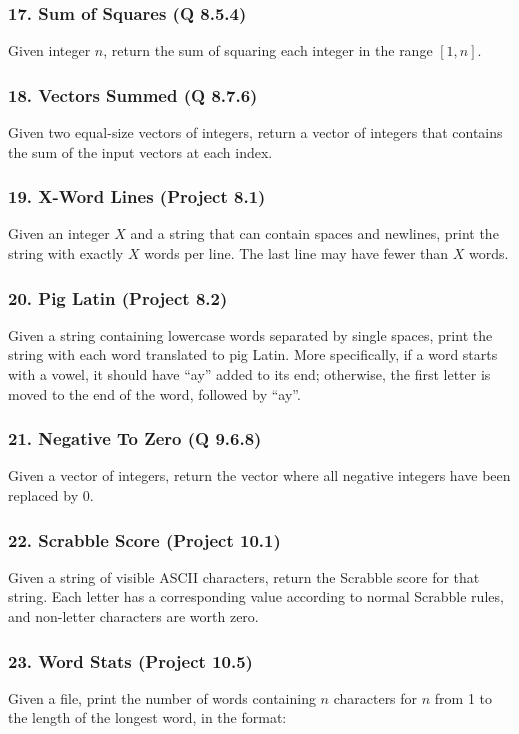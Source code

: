 \documentclass{sig-alternate}
\begin{document}
\subsubsection*{17. Sum of Squares (Q 8.5.4)}
Given integer $n$, return the sum of squaring each integer in the range $[1, n]$.

\subsubsection*{18. Vectors Summed (Q 8.7.6)}
Given two equal-size vectors of integers, return a vector of integers that contains the sum of the input vectors at each index.

\subsubsection*{19. X-Word Lines (Project 8.1)}
Given an integer $X$  and a string that can contain spaces and newlines, print the string with exactly $X$ words per line. The last line may have fewer than $X$ words.

\subsubsection*{20. Pig Latin (Project 8.2)}
Given a string containing lowercase words separated by single spaces, print the string with each word translated to pig Latin. More specifically, if a word starts with a vowel, it should have ``ay'' added to its end; otherwise, the first letter is moved to the end of the word, followed by ``ay''.

\subsubsection*{21. Negative To Zero (Q 9.6.8)}
Given a vector of integers, return the vector where all negative integers have been replaced by 0.

\subsubsection*{22. Scrabble Score (Project 10.1)}
Given a string of visible ASCII characters, return the Scrabble score for that string. Each letter has a corresponding value according to normal Scrabble rules, and non-letter characters are worth zero.

\subsubsection*{23. Word Stats (Project 10.5)}
Given a file, print the number of words containing $n$ characters for $n$ from 1 to the length of the longest word, in the format:
\end{document}
